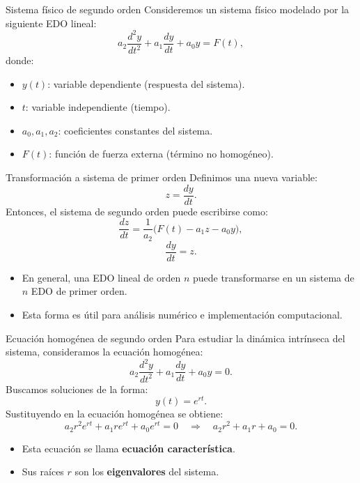 \documentclass[../../main.tex]{subfiles}
\begin{document}
\begin{frame}{Sistema físico de segundo orden}
  Consideremos un sistema físico modelado por la siguiente EDO lineal:
  \[
    a_2 \frac{d^2 y}{dt^2} + a_1 \frac{dy}{dt} + a_0 y = F(t),
  \]
  donde:
  \begin{itemize}
    \item \(y(t)\): variable dependiente (respuesta del sistema).
    \item \(t\): variable independiente (tiempo).
    \item \(a_0, a_1, a_2\): coeficientes constantes del sistema.
    \item \(F(t)\): función de fuerza externa (término no homogéneo).
  \end{itemize}
\end{frame}

\begin{frame}{Transformación a sistema de primer orden}
  Definimos una nueva variable:
  \[
    z = \frac{dy}{dt}.
  \]
  Entonces, el sistema de segundo orden puede escribirse como:
  \[
    \frac{dz}{dt} = \frac{1}{a_2}\big(F(t) - a_1 z - a_0 y\big),
  \]
  \[
    \frac{dy}{dt} = z.
  \]
  \begin{itemize}
    \item En general, una EDO lineal de orden \(n\) puede transformarse en un sistema de \(n\) EDO de primer orden.
    \item Esta forma es útil para análisis numérico e implementación computacional.
  \end{itemize}
\end{frame}

\begin{frame}{Ecuación homogénea de segundo orden}
  Para estudiar la dinámica intrínseca del sistema, consideramos la ecuación homogénea:
  \[
    a_2 \frac{d^2 y}{dt^2} + a_1 \frac{dy}{dt} + a_0 y = 0.
  \]
  Buscamos soluciones de la forma:
  \[
    y(t) = e^{rt}.
  \]
  Sustituyendo en la ecuación homogénea se obtiene:
  \[
    a_2 r^2 e^{rt} + a_1 r e^{rt} + a_0 e^{rt} = 0
    \quad \Rightarrow \quad
    a_2 r^2 + a_1 r + a_0 = 0.
  \]
  \begin{itemize}
    \item Esta ecuación se llama \textbf{ecuación característica}.
    \item Sus raíces \(r\) son los \textbf{eigenvalores} del sistema.
  \end{itemize}
\end{frame}
\end{document}
